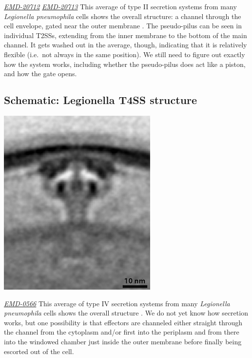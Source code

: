 \documentclass[]{tufte-book}
\begin{document}
\href{https://www.ebi.ac.uk/pdbe/entry/emdb/EMD-20712}{\emph{EMD-20712}} \href{https://www.ebi.ac.uk/pdbe/entry/emdb/EMD-20713}{\emph{EMD-20713}}
This average of type II secretion systems from many \emph{Legionella pneumophila} cells shows the overall structure: a channel through the cell envelope, gated near the outer membrane \citep{ghosal2019}. The pseudo-pilus can be seen in individual T2SSs, extending from the inner membrane to the bottom of the main channel. It gets washed out in the average, though, indicating that it is relatively flexible (i.e.~not always in the same position). We still need to figure out exactly how the system works, including whether the pseudo-pilus does act like a piston, and how the gate opens.

\hypertarget{Legionella_T4SS_structure}{%
\subsection*{Schematic: Legionella T4SS structure}\label{Legionella_T4SS_structure}}

\includegraphics{img/schematics/9_3_2}

\href{https://www.ebi.ac.uk/pdbe/entry/emdb/EMD-0566}{\emph{EMD-0566}}
This average of type IV secretion systems from many \emph{Legionella pneumophila} cells shows the overall structure \citep{ghosal2019a}. We do not yet know how secretion works, but one possibility is that effectors are channeled either straight through the channel from the cytoplasm and/or first into the periplasm and from there into the windowed chamber just inside the outer membrane before finally being escorted out of the cell.
\end{document}

